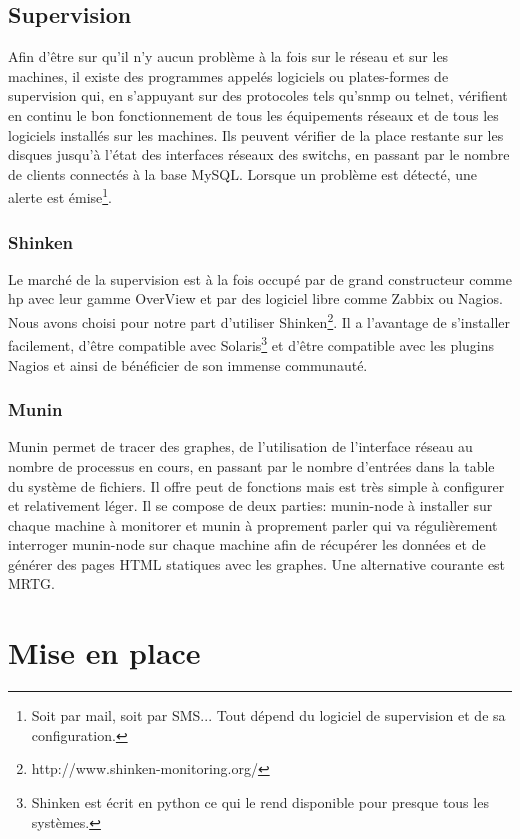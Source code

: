 \documentclass[a4paper,oneside]{report}
\begin{document}
\section{Supervision}
Afin d'être sur qu'il n'y aucun problème à la fois sur le réseau et sur les machines, il existe des programmes appelés logiciels ou plates-formes de supervision qui, en s'appuyant sur des protocoles tels qu'\gls{snmp} ou \gls{telnet}, vérifient en continu le bon fonctionnement de tous les équipements réseaux et de tous les logiciels installés sur les machines.
Ils peuvent vérifier de la place restante sur les disques jusqu'à l'état des interfaces réseaux des switchs, en passant par le nombre de clients connectés à la base MySQL.
Lorsque un problème est détecté, une alerte est émise\footnote{Soit par mail, soit par SMS... Tout dépend du logiciel de supervision et de sa configuration.}.


\subsection{Shinken}
Le marché de la supervision est à la fois occupé par de grand constructeur comme \gls{hp} avec leur gamme OverView et par des logiciel libre comme Zabbix ou Nagios.
Nous avons choisi pour notre part d'utiliser Shinken\footnote{http://www.shinken-monitoring.org/}.
Il a l'avantage de s'installer facilement, d'être compatible avec Solaris\footnote{Shinken est écrit en python ce qui le rend disponible pour presque tous les systèmes.} et d'être compatible avec les plugins Nagios et ainsi de bénéficier de son immense communauté.

\subsection{Munin}
Munin permet de tracer des graphes, de l'utilisation de l'interface réseau au nombre de processus en cours, en passant par le nombre d'entrées dans la table du système de fichiers. Il offre peut de fonctions mais est très simple à configurer et relativement léger.\newline
Il se compose de deux parties: munin-node à installer sur chaque machine à monitorer et munin à proprement parler qui va régulièrement interroger munin-node sur chaque machine afin de récupérer les données et de générer des pages HTML statiques avec les graphes.\newline
Une alternative courante est MRTG.


\chapter{Mise en place} \label{cha:miseenplace}
\end{document}
